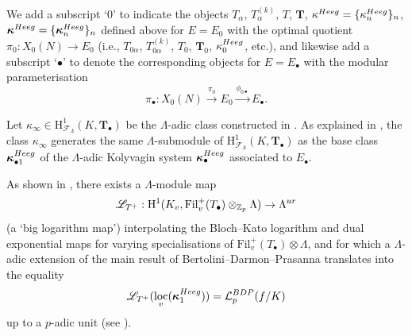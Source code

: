 \documentclass[10pt,reqno]{amsart}
\numberwithin{equation}{section}
\theoremstyle{plain}
\theoremstyle{definition}
\theoremstyle{definition}
\theoremstyle{plain}
\theoremstyle{plain}
\theoremstyle{plain}
\theoremstyle{plain}
\theoremstyle{plain}
\theoremstyle{plain}
\newcommand{\Fil}{\mathrm{Fil}}
\newcommand{\Z}{\mathbb{Z}}
\newcommand{\Zp}{\mathbb{Z}_{p}}
\newcommand{\bkappa}{\boldsymbol{\kappa}}
\DeclareMathOperator{\loc}{loc}
\newcommand{\Lcal}{\mathcal{L}}
\newcommand{\Fcal}{\mathcal{F}}
\newcommand{\rH}{\mathrm{H}}
\begin{document}
We add a subscript `$0$' to indicate the objects $T_{\alpha}$,  $T_{\alpha}^{(k)}$, $T$, $\mathbf{T}$, $\kappa^{\rm Heeg}=\{\kappa_{n}^{\rm Heeg}\}_n$, $\boldsymbol{\kappa}^{\rm Heeg}=\{\boldsymbol{\kappa}_n^{\rm Heeg}\}_n$ defined above for $E=E_0$ with the optimal quotient $\pi_0:X_0(N)\rightarrow E_0$ (i.e., $T_{0\alpha}$,  $T_{0\alpha}^{(k)}$, $T_0$, $\mathbf{T}_{0}$, $\kappa_{0}^{\rm Heeg}$, etc.), and likewise add a subscript `$\bullet$' to denote the corresponding objects for $E=E_\bullet$ with the modular parameterisation 
\[
\pi_\bullet:X_0(N)\xrightarrow{\pi_0}E_0\xrightarrow{\phi_{0\bullet}} E_\bullet.
\]
%
%
%

Let $\kappa_\infty\in\rH^1_{\Fcal_\Lambda}(K,\mathbf{T}_\bullet)$ be the $\Lambda$-adic class constructed in \cite[\S{5.2}]{cas-hsieh1}. As explained in \cite[Rem.~4.1.3]{eisenstein}, the class $\kappa_\infty$ generates the same $\Lambda$-submodule of $\rH^1_{\Fcal_\Lambda}(K,\mathbf{T}_\bullet)$ as the base class $\bkappa_{\bullet 1}^{\rm Heeg}$ of the $\Lambda$-adic Kolyvagin system $\bkappa_\bullet^{\rm Heeg}$ associated to $E_\bullet$.
%

As shown in \cite[\S{5}]{cas-hsieh1}, there exists a $\Lambda$-module map 
\[
\mathscr{L}_{T^+}:\rH^1(K_v, \Fil_v^+(T_\bullet)\otimes_{\Zp}\Lambda) \rightarrow \Lambda^{\rm ur}
\]
(a `big logarithm map') interpolating the Bloch--Kato logarithm and dual exponential maps for varying specialisations of $\Fil_v^+(T_\bullet)\otimes\Lambda$, and for which a $\Lambda$-adic extension of the main result of Bertolini--Darmon--Prasanna \cite{BDP} translates into the equality
\begin{equation}\label{eq:BDP-ERL}
\mathscr{L}_{T^+}(\loc_v(\bkappa_1^{\rm Heeg}))= \Lcal_p^{\rm BDP}(f/K)
\end{equation}
up to a $p$-adic unit (see \cite[Thm.~5.7]{cas-hsieh1}).
\end{document}
